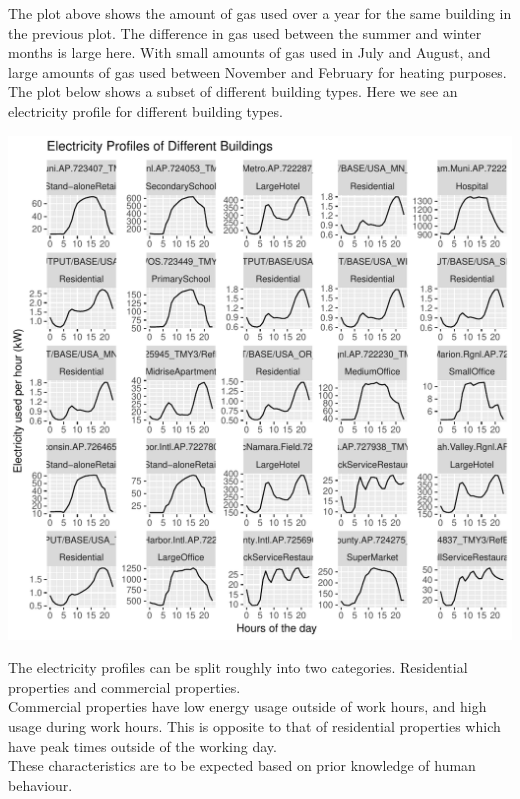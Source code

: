 \documentclass[12pt]{article}\usepackage[]{graphicx}\usepackage[]{color}
\makeatletter
\def\maxwidth{ %
  \ifdim\Gin@nat@width>\linewidth
    \linewidth
  \else
    \Gin@nat@width
  \fi
}
\newenvironment{knitrout}{}{} %
\makeatother
\begin{document}
The plot above shows the amount of gas used over a year for the same building in the previous plot. The difference in gas used between the summer and winter months is large here. With small amounts of gas used in July and August, and large amounts of gas used between November and February for heating purposes. \\

The plot below shows a subset of different building types. Here we see an electricity profile for different building types. 

\begin{knitrout}
\color{fgcolor}
\includegraphics[width=\maxwidth]{figure/plot_different_profiles-1} 

\end{knitrout}

The electricity profiles can be split roughly into two categories. Residential properties and commercial properties.\\

Commercial properties have low energy usage outside of work hours, and high usage during work hours. This is opposite to that of residential properties which have peak times outside of the working day.\\

These characteristics are to be expected based on prior knowledge of human behaviour. \\
\end{document}
